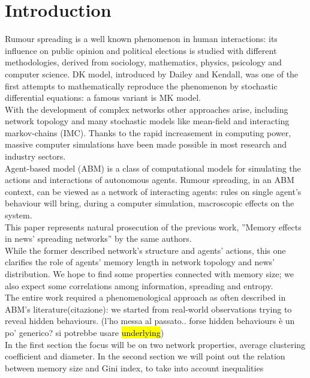 \section{Introduction} \label{introduction}
Rumour spreading is a well known phenomenon in human interactions:
its influence on public opinion\cite{publicoprumsp} and political
elections\cite{politicalrumsp} is studied with different
methodologies, derived from sociology, mathematics,
physics, psicology and computer science.
DK model,\cite{DKmodel} introduced by Dailey and Kendall, was one of
the first attempts to mathematically reproduce the phenomenon by
stochastic differential equations: a famous variant is MK
model.\cite{MKmodel}\\
With the development of complex networks other approaches arise,
including network topology and many stochastic models
like mean-field\cite{meanfield} and interacting markov-chains\cite{IMC} (IMC).
Thanks to the rapid increasement in computing power,
massive computer simulations have been made possible in
most research and industry sectors.\\
Agent-based model (ABM) is a class of computational models for
simulating the actions and interactions of autonomous
agents.\cite{Agentbased}
Rumour spreading, in an ABM context, can be viewed as a network
of interacting agents: rules on single agent's behaviour
will bring, during a computer simulation, macroscopic
effects on the system.\\
This paper represents natural prosecution of the previous work,
''Memory effects in news' spreading networks'' by the same
authors.\cite{ourpaper}\\
While the former described network's structure and agents' actions,
this one clarifies the role of agents' memory length in network
topology and news' distribution.
We hope to find some properties connected with memory size;
we also expect some correlations among information,
spreading and entropy.\\
The entire work required a phenomenological approach as often described in
ABM's literature(citazione): we started from real-world observations trying
to reveal hidden behaviours.
(l'ho messa al passato.. forse hidden behaviours è un po' generico?
si potrebbe usare \hl{underlying})\\
 In the first section the focus will be on two network properties, average clustering coefficient
and diameter. In the second section we will point out the relation
between memory size and Gini index, to take into account inequalities
